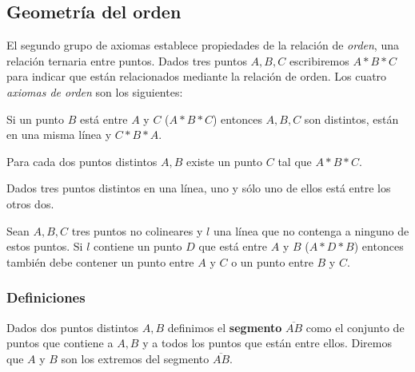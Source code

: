 \subsection{Geometría del orden}

El segundo grupo de axiomas establece propiedades de la relación de
\textit{orden}, una relación ternaria entre puntos. Dados tres puntos $A, B, C$
escribiremos $A * B * C$ para indicar que están relacionados mediante la
relación de orden.
Los cuatro \textit{axiomas de orden} son los siguientes:

\begin{ax}\label{ax:B1}
	Si un punto $B$ está entre $A$ y $C$ ($A * B * C$) entonces $A, B, C$ son
	distintos, están en una misma línea y $C * B * A$.
\end{ax}

\begin{ax}\label{ax:B2}
	Para cada dos puntos distintos $A,B$ existe un punto $C$ tal que $A * B * C$.
\end{ax}

\begin{ax}\label{ax:3}
	Dados tres puntos distintos en una línea, uno y sólo uno de ellos está entre
	los otros dos.
\end{ax}

\begin{ax}[Pasch]\label{ax:4}
	Sean $A, B, C$ tres puntos no colineares y $l$ una línea que no contenga a
	ninguno de estos puntos. Si $l$ contiene un punto $D$ que está entre $A$ y $B$
	($A * D * B$) entonces también debe contener un punto entre $A$ y $C$ o un
	punto entre $B$ y $C$.
\end{ax}



\subsubsection*{Definiciones}

\begin{defin*}[Segmentos]
	Dados dos puntos distintos $A, B$ definimos el \textbf{segmento}
	$\overline{AB}$ como el conjunto de puntos que contiene a $A, B$ y a todos los
	puntos que están entre ellos. Diremos que $A$ y $B$ son los extremos del
	segmento $\overline{AB}$.
\end{defin*}


